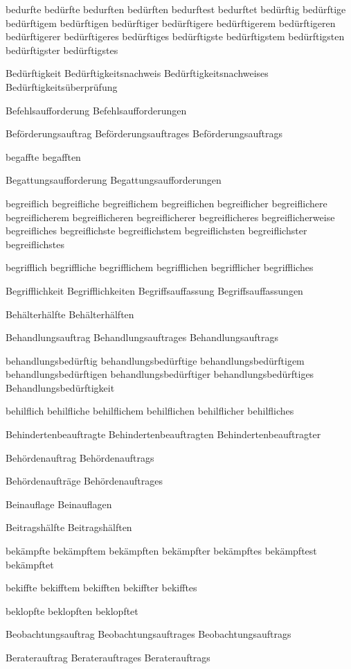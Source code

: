 bedurfte
bedürfte
bedurften
bedürften
bedurftest
bedurftet
bedürftig
bedürftige
bedürftigem
bedürftigen
bedürftiger
bedürftigere
bedürftigerem
bedürftigeren
bedürftigerer
bedürftigeres
bedürftiges
bedürftigste
bedürftigstem
bedürftigsten
bedürftigster
bedürftigstes

Bedürftigkeit
Bedürftigkeitsnachweis
Bedürftigkeitsnachweises
Bedürftigkeitsüberprüfung

Befehlsaufforderung
Befehlsaufforderungen

Beförderungsauftrag
Beförderungsauftrages
Beförderungsauftrags

begaffte
begafften

Begattungsaufforderung
Begattungsaufforderungen

begreiflich
begreifliche
begreiflichem
begreiflichen
begreiflicher
begreiflichere
begreiflicherem
begreiflicheren
begreiflicherer
begreiflicheres
begreiflicherweise
begreifliches
begreiflichste
begreiflichstem
begreiflichsten
begreiflichster
begreiflichstes

begrifflich
begriffliche
begrifflichem
begrifflichen
begrifflicher
begriffliches

Begrifflichkeit
Begrifflichkeiten
Begriffsauffassung
Begriffsauffassungen


Behälterhälfte
Behälterhälften

Behandlungsauftrag
Behandlungsauftrages
Behandlungsauftrags

behandlungsbedürftig
behandlungsbedürftige
behandlungsbedürftigem
behandlungsbedürftigen
behandlungsbedürftiger
behandlungsbedürftiges
Behandlungsbedürftigkeit

behilflich
behilfliche
behilflichem
behilflichen
behilflicher
behilfliches

Behindertenbeauftragte
Behindertenbeauftragten
Behindertenbeauftragter

Behördenauftrag
Behördenauftrags

Behördenaufträge
Behördenauftrages

Beinauflage
Beinauflagen

Beitragshälfte
Beitragshälften

bekämpfte
bekämpftem
bekämpften
bekämpfter
bekämpftes
bekämpftest
bekämpftet

bekiffte
bekifftem
bekifften
bekiffter
bekifftes

beklopfte
beklopften
beklopftet

Beobachtungsauftrag
Beobachtungsauftrages
Beobachtungsauftrags

Beraterauftrag
Beraterauftrages
Beraterauftrags

